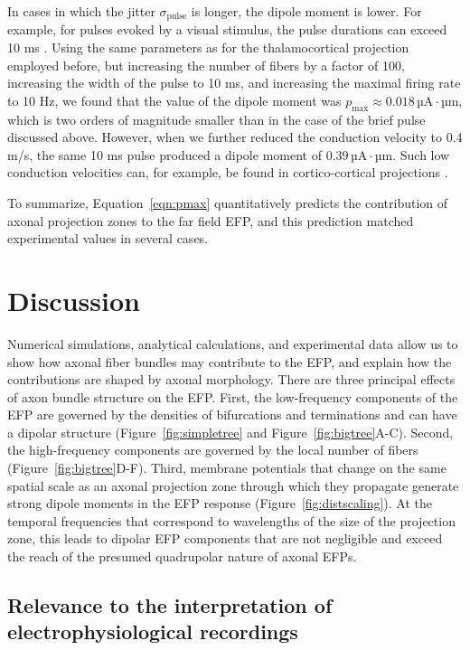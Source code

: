 \documentclass[]{elife}
\begin{document}
In cases in which the jitter \(\sigma_\text{pulse}\) is longer, the
dipole moment is lower. For example, for pulses evoked by a visual
stimulus, the pulse durations can exceed 10 ms
\citep{Mitzdorf1985Current, Schroeder1991Striate, Schroeder1998Spatiotemporal, Self2013Distinct}.
Using the same parameters as for the thalamocortical projection employed
before, but increasing the number of fibers by a factor of 100,
increasing the width of the pulse to 10 ms, and increasing the maximal
firing rate to 10 Hz, we found that the value of the dipole moment was
\(p_\text{max} \approx 0.018\,\text{µA}\cdot\text{µm}\), which is two
orders of magnitude smaller than in the case of the brief pulse
discussed above. However, when we further reduced the conduction
velocity to 0.4 m/s, the same 10 ms pulse produced a dipole moment of
\(0.39\, \text{µA}\cdot\text{µm}\). Such low conduction velocities can,
for example, be found in cortico-cortical projections
\citep{Swadlow1989Efferent}.

To summarize, Equation~\ref{eqn:pmax} quantitatively predicts the
contribution of axonal projection zones to the far field EFP, and this
prediction matched experimental values in several cases.

\section{Discussion}\label{discussion}

Numerical simulations, analytical calculations, and experimental data
allow us to show how axonal fiber bundles may contribute to the EFP, and
explain how the contributions are shaped by axonal morphology. There are
three principal effects of axon bundle structure on the EFP. First, the
low-frequency components of the EFP are governed by the densities of
bifurcations and terminations and can have a dipolar structure
(Figure~\ref{fig:simpletree} and Figure~\ref{fig:bigtree}A-C). Second,
the high-frequency components are governed by the local number of fibers
(Figure~\ref{fig:bigtree}D-F). Third, membrane potentials that change on
the same spatial scale as an axonal projection zone through which they
propagate generate strong dipole moments in the EFP response
(Figure~\ref{fig:distscaling}). At the temporal frequencies that
correspond to wavelengths of the size of the projection zone, this leads
to dipolar EFP components that are not negligible and exceed the reach
of the presumed quadrupolar nature of axonal EFPs.

\subsection{Relevance to the interpretation of electrophysiological
recordings}\label{relevance-to-the-interpretation-of-electrophysiological-recordings}
\end{document}
